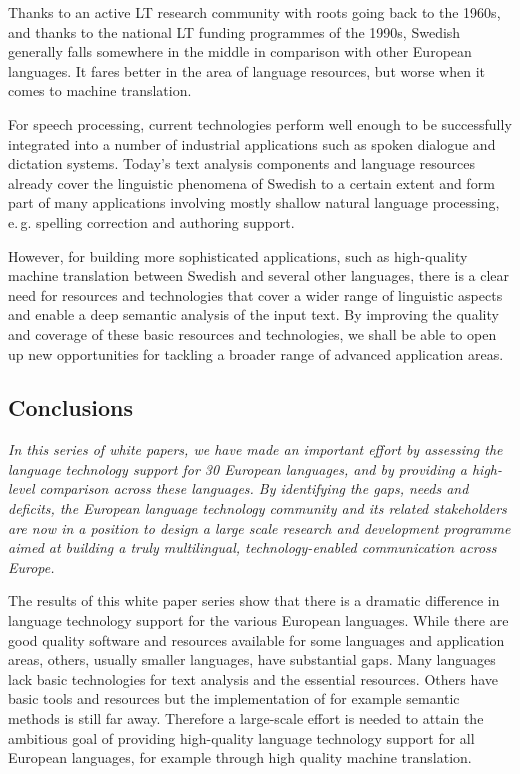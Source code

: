 \begin{multicols}{2}
Thanks to an active LT research community with roots going back to the
1960s, and thanks to the national LT funding programmes of the 1990s,
Swedish generally falls somewhere in the middle in comparison with
other European languages. It fares better in the area of language
resources, but worse when it comes to machine translation.


For speech processing, current technologies perform well enough to be
successfully integrated into a number of industrial applications such
as spoken dialogue and dictation systems. Today's text analysis
components and language resources already cover the linguistic
phenomena of Swedish to a certain extent and form part of many
applications involving mostly shallow natural language processing,
e.\,g. spelling correction and authoring support.

However, for building more sophisticated applications, such as
high-quality machine translation between Swedish and several other
languages, there is a clear need for resources and technologies that
cover a wider range of linguistic aspects and enable a deep semantic
analysis of the input text. By improving the quality and coverage of
these basic resources and technologies, we shall be able to open up
new opportunities for tackling a broader range of advanced application
areas.


\subsection{Conclusions}

\emph{In this series of white papers, we have made an important effort by assessing the language technology support for 30 European languages, and by providing a high-level comparison across these languages. By identifying the gaps, needs and deficits, the European language technology community and its related stakeholders are now in a position to design a large scale research and development programme aimed at building a truly multilingual, technology-enabled communication across Europe.}

The results of this white paper series show that there is a dramatic difference in language technology support for the various European languages. While there are good quality software and resources available for some languages and application areas, others, usually smaller languages, have substantial gaps. Many languages lack basic technologies for text analysis and the essential resources. Others have basic tools and resources but the implementation of for example semantic methods is still far away. Therefore a large-scale effort is needed to attain the ambitious goal of providing high-quality language technology support for all European languages, for example through high quality machine translation. 


\end{multicols}
